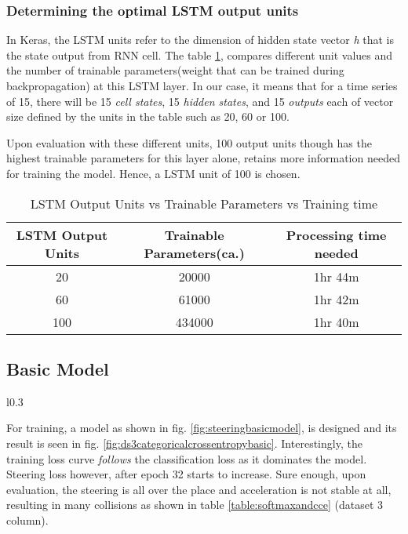 \subsubsection*{Determining the optimal LSTM output units}
In Keras, the LSTM units refer to the dimension of hidden state vector \textit{h} that is the state output from RNN cell.
The table \ref{table:unitsvstime}, compares different unit values and the number of
trainable parameters(weight that can be trained during backpropagation) at this LSTM
layer.
In our case, it means that for a time series of 15, there will be 15 \textit{cell states},
15 \textit{hidden states}, and 15 \textit{outputs} each of vector size defined by the
units in the table such as 20, 60 or 100.

Upon evaluation with these different units, 100 output units though has the highest
trainable parameters for this layer alone, retains more information needed for training
the model.  Hence, a LSTM unit of 100 is chosen.
\begin{table}[t]
    \centering
\begin{tabular}{ccc}
    \toprule
    LSTM Output Units & Trainable Parameters(ca.) & Processing time needed \\\midrule
    20 & 20000 & 1hr 44m  \\
    60 & 61000 & 1hr 42m \\
    100 & 434000  & 1hr 40m \\\bottomrule
\end{tabular}
\caption{LSTM Output Units vs Trainable Parameters vs Training time}
\label{table:unitsvstime}
\end{table}
\subsection{Basic Model}
\begin{wrapfigure}{l}{0.3\textwidth}
	\centering
    \def\svgwidth{0.2\textwidth}
    \caption{Basic model}
    \label{fig:steeringbasicmodel}
    \vspace*{-0.41in}
\end{wrapfigure}

For training, a model as shown in fig. \ref{fig:steeringbasicmodel}, is designed and its
result is seen in fig. \ref{fig:ds3categoricalcrossentropybasic}. Interestingly, the
training loss curve \textit{follows} the classification loss as it dominates the model. Steering
loss however, after epoch 32 starts to increase. Sure enough, upon evaluation,
the steering is all over the place and acceleration is not stable at all, resulting in
many collisions as shown in table \ref{table:softmaxandcce} (dataset 3 column).

